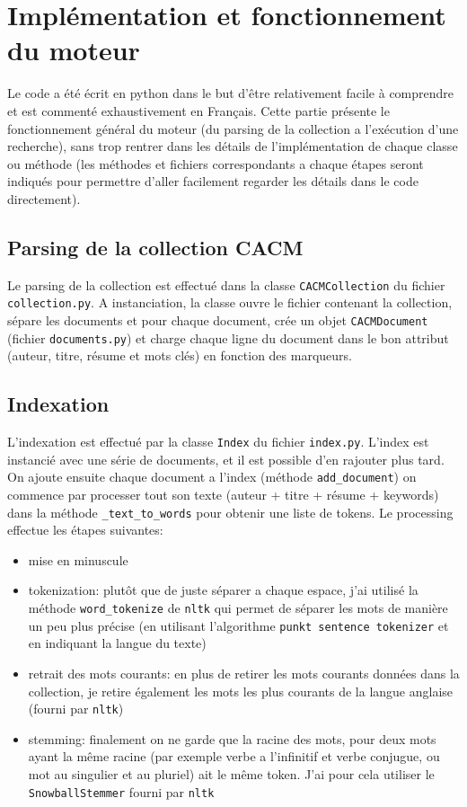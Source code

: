 \documentclass{article}
\begin{document}
\section{Implémentation et fonctionnement du moteur}
Le code a été écrit en python dans le but d’être relativement facile à comprendre et est commenté exhaustivement en Français. Cette partie présente le fonctionnement général du moteur (du parsing de la collection a l’exécution d'une recherche), sans trop rentrer dans les détails de l’implémentation de chaque classe ou méthode (les méthodes et fichiers correspondants a chaque étapes seront indiqués pour permettre d'aller facilement regarder les détails dans le code directement).

\subsection{Parsing de la collection CACM}
Le parsing de la collection est effectué dans la classe \texttt{CACMCollection} du fichier \texttt{collection.py}. A instanciation, la classe ouvre le fichier contenant la collection, sépare les documents et pour chaque document, crée un objet \texttt{CACMDocument} (fichier \texttt{documents.py}) et charge chaque ligne du document dans le bon attribut (auteur, titre, résume et mots clés) en fonction des marqueurs.

\subsection{Indexation}
L'indexation est effectué par la classe \texttt{Index} du fichier \texttt{index.py}. L'index est instancié avec une série de documents, et il est possible d'en rajouter plus tard. On ajoute ensuite chaque document a l'index (méthode \texttt{add\_document}) on commence par processer tout son texte (auteur + titre + résume + keywords) dans la méthode \texttt{\_text\_to\_words} pour obtenir une liste de tokens. Le processing effectue les étapes suivantes:
\begin{itemize}
    \item mise en minuscule
    \item tokenization: plutôt que de juste séparer a chaque espace, j'ai utilisé la méthode \texttt{word\_tokenize} de \texttt{nltk} qui permet de séparer les mots de manière un peu plus précise (en utilisant l'algorithme \texttt{punkt sentence tokenizer} et en indiquant la langue du texte)
    \item retrait des mots courants: en plus de retirer les mots courants données dans la collection, je retire également les mots les plus courants de la langue anglaise (fourni par \texttt{nltk})
    \item stemming: finalement on ne garde que la racine des mots, pour deux mots ayant la même racine (par exemple verbe a l’infinitif et verbe conjugue, ou mot au singulier et au pluriel) ait le même token. J'ai pour cela utiliser le \texttt{SnowballStemmer} fourni par \texttt{nltk}
\end{itemize}
\end{document}
